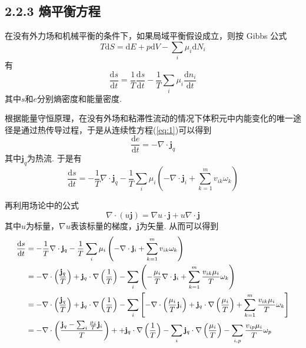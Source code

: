 \documentclass[10pt,aspectratio=43,mathserif,table]{ctexbeamer}
\newcommand{\customref}[1]{(\ref{#1})}
\begin{document}
\subsection{2.2.3 熵平衡方程}
\begin{frame}

    在没有外力场和机械平衡的条件下，如果局域平衡假设成立，则按 Gibbs 公式
    $$
    T\mathrm{d}S=\mathrm{d}E+p\mathrm{d}V-\sum_i{\mu _i\mathrm{d}N_i}
    $$
    有
    $$
    \frac{\mathrm{d}s}{\mathrm{d}t}=\frac{1}{T}\frac{\mathrm{d}s}{\mathrm{d}t}-\frac{1}{T}\sum_i{\mu _i\frac{\mathrm{d}n_i}{\mathrm{d}t}}
    $$
    其中$s$和$e$分别熵密度和能量密度. 

\end{frame}

\begin{frame}
    根据能量守恒原理，在没有外场和粘滞性流动的情况下体积元中内能变化的唯一途径是通过热传导过程，于是从连续性方程\customref{eq:1}可以得到
    $$
    \frac{\mathrm{d}e}{\mathrm{d}t}=-\nabla \cdot \mathbf{j}_q
    $$
    其中$\mathbf{j}_q$为热流. 于是有
    $$
    \frac{\mathrm{d}s}{\mathrm{d}t}=-\frac{1}{T}\nabla \cdot \mathbf{j}_q-\frac{1}{T}\sum_i{\mu _i\left( -\nabla \cdot \mathbf{j}_i+\sum_{k=1}^m{v_{ik}\omega _k} \right)}
    $$

\end{frame}

\begin{frame}
    再利用场论中的公式
    $$
    \nabla \cdot \left( u\mathbf{j} \right) =\nabla u\cdot \mathbf{j}+u\nabla \cdot \mathbf{j}
    $$
    其中$u$为标量，$\nabla u$表该标量的梯度，$\mathbf{j}$为矢量. 从而可以得到
    $$
    \small{\begin{aligned}
        \frac{\mathrm{d}s}{\mathrm{d}t}&=-\frac{1}{T}\nabla \cdot \mathbf{j}_q-\frac{1}{T}\sum_i{\mu _i\left( -\nabla \cdot \mathbf{j}_i+\sum_{k=1}^m{v_{ik}\omega _k} \right)}\\
        &=-\nabla \cdot \left( \frac{\mathbf{j}_q}{T} \right) +\mathbf{j}_q\cdot \nabla \left( \frac{1}{T} \right) -\sum_i{\left( -\frac{\mu _i}{T}\nabla \cdot \mathbf{j}_i+\sum_{k=1}^m{\frac{v_{ik}\mu _i}{T}\omega _k} \right)}\\
        &=-\nabla \cdot \left( \frac{\mathbf{j}_q}{T} \right) +\mathbf{j}_q\cdot \nabla \left( \frac{1}{T} \right) -\sum_i{\left[ -\nabla \cdot \left( \frac{\mu _i}{T}\mathbf{j}_i \right) +\mathbf{j}_q\cdot \nabla \left( \frac{\mu _i}{T} \right) +\sum_{k=1}^m{\frac{v_{ik}\mu _i}{T}\omega _k} \right]}\\
        &=-\nabla \cdot \left( \frac{\mathbf{j}_q-\sum_i{\frac{\mu _i}{T}\mathbf{j}_i}}{T} \right) ++\mathbf{j}_q\cdot \nabla \left( \frac{1}{T} \right) -\sum_i{\mathbf{j}_q\cdot \nabla \left( \frac{\mu _i}{T} \right)}-\sum_{i,p}{\frac{v_{ip}\mu _i}{T}\omega _p}\\
    \end{aligned}}
    $$

\end{frame}
\end{document}
